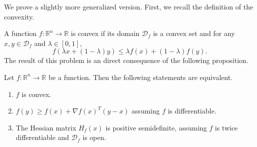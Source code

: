 We prove a slightly more generalized version. First, we recall the
definition of the convexity. 
\begin{defn}
A function $f:\mathbb{R}^{n}\rightarrow\mathbb{R}$ is convex if its
domain $\mathcal{D}_{f}$ is a convex set and for any $x,y\in\mathcal{D}_{f}$
and $\lambda\in[0,1],$ 
\[
f(\lambda x+(1-\lambda)y)\leq\lambda f(x)+(1-\lambda)f(y).\tag{1}
\]
The result of this problem is an direct consequence of the following
proposition.
\end{defn}
\begin{prop}
Let $f:\mathbb{R}^{n}\rightarrow\mathbb{R}$ be a function. Then the
following statements are equivalent. 
\begin{enumerate}
\item $f$ is convex. 
\item $f(y)\geq f(x)+\nabla f(x)^{T}(y-x)$ assuming $f$ is differentiable. 
\item The Hessian matrix $H_{f}(x)$ is positive semidefinite, assuming
$f$ is twice differentiable and $\mathcal{D}_{f}$ is open. 
\end{enumerate}
\end{prop}
